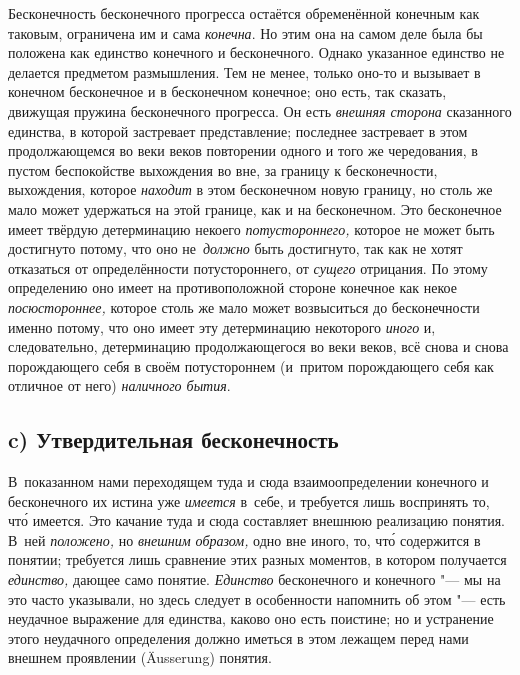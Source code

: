 Бесконечность бесконечного прогресса остаётся обременённой конечным как
таковым, ограничена им и сама {\em конечна}. Но этим
она на самом деле была бы положена как единство конечного и бесконечного.
Однако указанное единство не делается предметом размышления. Тем не менее,
только оно-то и вызывает в конечном бесконечное и в бесконечном конечное;
оно есть, так сказать, движущая пружина бесконечного прогресса. Он есть
{\em внешняя сторона} сказанного единства, в которой
застревает представление; последнее застревает в этом продолжающемся во
веки веков повторении одного и того же чередования, в пустом беспокойстве
выхождения во вне, за границу к бесконечности, выхождения, которое
{\em находит} в этом бесконечном новую границу, но
столь же мало может удержаться на этой границе, как и на бесконечном. Это
бесконечное имеет твёрдую детерминацию некоего
{\em потустороннего,} которое не может быть достигнуто
потому, что оно не~{\em должно} быть достигнуто, так
как не хотят отказаться от определённости потустороннего, от
{\em сущего} отрицания. По этому определению оно имеет
на противоположной стороне конечное как некое
{\em посюстороннее,} которое столь же мало может
возвыситься до бесконечности именно потому, что оно имеет эту детерминацию
некоторого {\em иного} и, следовательно, детерминацию
продолжающегося во веки веков, всё снова и снова порождающего себя в своём
потустороннем (и~притом порождающего себя как отличное от него)
{\em наличного бытия}.

\subsection[c) Утвердительная бесконечность]{c) Утвердительная бесконечность}

В~показанном нами переходящем туда и сюда взаимоопределении конечного и
бесконечного их истина уже {\em имеется} в~себе, и
требуется лишь воспринять то, чт\'{о} имеется. Это качание туда и сюда
составляет внешнюю реализацию понятия. В~ней
{\em положено,} но {\em внешним
образом,} одно вне иного, то, чт\'{о} содержится в понятии; требуется лишь
сравнение этих разных моментов, в котором получается
{\em единство,} дающее само понятие.
{\em Единство} бесконечного и конечного "--- мы на это
часто указывали, но здесь следует в особенности напомнить об этом "--- есть
неудачное выражение для единства, каково оно есть поистине; но и устранение
этого неудачного определения должно иметься в этом лежащем перед нами
внешнем проявлении (Äusserung) понятия.

